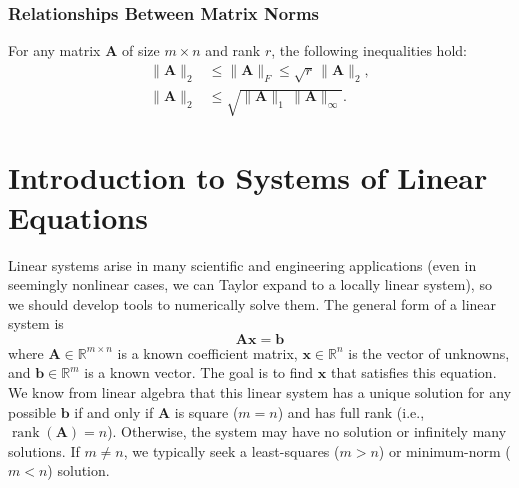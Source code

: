 \subsubsection{Relationships Between Matrix Norms}
For any matrix $ \mathbf{A} $ of size $ m \times n $ and rank $ r $, the following inequalities hold:
\begin{align*}
    \|\mathbf{A}\|_2 &\leq \|\mathbf{A}\|_F \leq \sqrt{r}\,\|\mathbf{A}\|_2, \\
    \|\mathbf{A}\|_2 &\leq \sqrt{\|\mathbf{A}\|_1 \, \|\mathbf{A}\|_\infty}.
\end{align*}

\section{Introduction to Systems of Linear Equations}
Linear systems arise in many scientific and engineering applications (even in seemingly nonlinear cases, we can Taylor expand to a locally linear system), so we should develop tools to numerically solve them. The general form of a linear system is
\begin{equation}
    \mathbf{A}\mathbf{x} = \mathbf{b}
    \label{eq:linear-system}
\end{equation}
where $ \mathbf{A} \in \mathbb{R}^{m \times n} $ is a known coefficient matrix, $ \mathbf{x} \in \mathbb{R}^n $ is the vector of unknowns, and $ \mathbf{b} \in \mathbb{R}^m $ is a known vector. The goal is to find $ \mathbf{x} $ that satisfies this equation. We know from linear algebra that this linear system has a unique solution for any possible $\mathbf{b}$ if and only if $ \mathbf{A} $ is square ($m=n$) and has full rank (i.e., $\operatorname{rank}(\mathbf{A})=n$). Otherwise, the system may have no solution or infinitely many solutions. If $m\ne n$, we typically seek a least-squares ($m>n$) or minimum-norm ($m<n$) solution.

